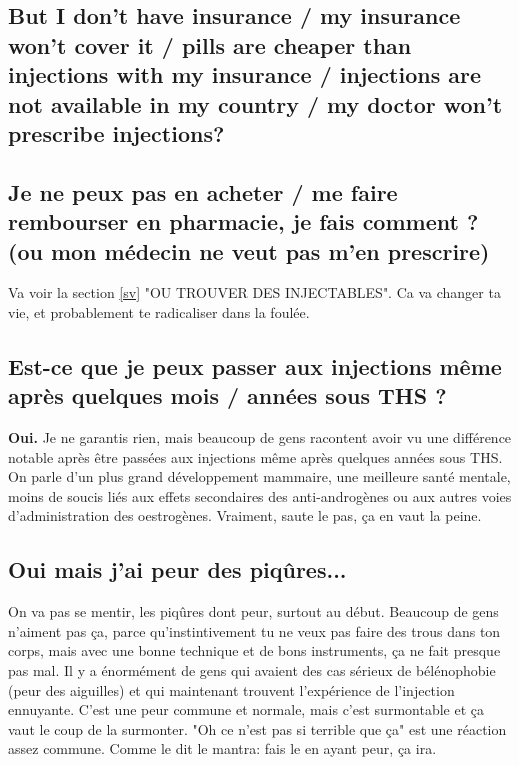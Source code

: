\documentclass{article}
\begin{document}
\subsection{But I don’t have insurance / my insurance won’t cover it / pills are cheaper than injections with my insurance / injections are not available in my country / my doctor won’t prescribe injections?}
\subsection{Je ne peux pas en acheter / me faire rembourser en pharmacie, je fais comment ? (ou mon médecin ne veut pas m'en prescrire)}

Va voir la section \ref{sv} "OU TROUVER DES INJECTABLES". Ca va changer ta vie, et probablement te radicaliser dans la foulée.

\subsection{Est-ce que je peux passer aux injections même après quelques mois / années sous THS ?}

\textbf{Oui.} Je ne garantis rien, mais beaucoup de gens racontent avoir vu une différence notable après être passées aux injections même après quelques années sous THS. On parle d'un plus grand développement mammaire, une meilleure santé mentale, moins de soucis liés aux effets secondaires des anti-androgènes ou aux autres voies d'administration des oestrogènes. Vraiment, saute le pas, ça en vaut la peine.

\subsection{Oui mais j'ai peur des piqûres...}

On va pas se mentir, les piqûres dont peur, surtout au début. Beaucoup de gens n'aiment pas ça, parce qu'instintivement tu ne veux pas faire des trous dans ton corps, mais avec une bonne technique et de bons instruments, ça ne fait presque pas mal. Il y a énormément de gens qui avaient des cas sérieux de bélénophobie (peur des aiguilles) et qui maintenant trouvent l'expérience de l'injection ennuyante. C'est une peur commune et normale, mais c'est surmontable et ça vaut le coup de la surmonter. "Oh ce n'est pas si terrible que ça" est une réaction assez commune. Comme le dit le mantra: fais le en ayant peur, ça ira. 
\end{document}
